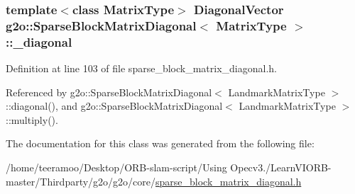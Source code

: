 \subsubsection[{\texorpdfstring{\+\_\+diagonal}{_diagonal}}]{\setlength{\rightskip}{0pt plus 5cm}template$<$class Matrix\+Type$>$ {\bf Diagonal\+Vector} {\bf g2o\+::\+Sparse\+Block\+Matrix\+Diagonal}$<$ Matrix\+Type $>$\+::\+\_\+diagonal\hspace{0.3cm}{\ttfamily [protected]}}\hypertarget{classg2o_1_1SparseBlockMatrixDiagonal_a0679df785f9e7b79a1e9dfe623af5341}{}\label{classg2o_1_1SparseBlockMatrixDiagonal_a0679df785f9e7b79a1e9dfe623af5341}


Definition at line 103 of file sparse\+\_\+block\+\_\+matrix\+\_\+diagonal.\+h.



Referenced by g2o\+::\+Sparse\+Block\+Matrix\+Diagonal$<$ Landmark\+Matrix\+Type $>$\+::diagonal(), and g2o\+::\+Sparse\+Block\+Matrix\+Diagonal$<$ Landmark\+Matrix\+Type $>$\+::multiply().



The documentation for this class was generated from the following file\+:\begin{DoxyCompactItemize}
\item 
/home/teeramoo/\+Desktop/\+O\+R\+B-\/slam-\/script/\+Using Opecv3./\+Learn\+V\+I\+O\+R\+B-\/master/\+Thirdparty/g2o/g2o/core/\hyperlink{sparse__block__matrix__diagonal_8h}{sparse\+\_\+block\+\_\+matrix\+\_\+diagonal.\+h}\end{DoxyCompactItemize}
